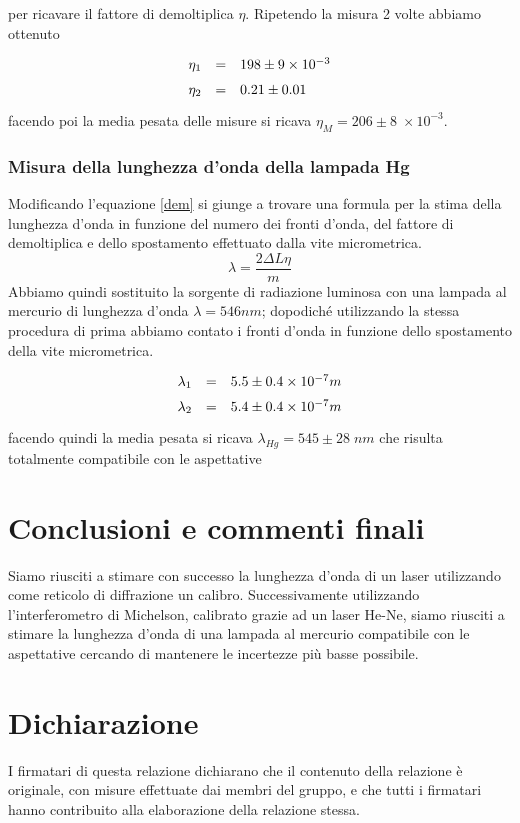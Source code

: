 \documentclass[10pt, a4paper, italian]{article}
\begin{document}
per ricavare il fattore di demoltiplica $\eta$.
Ripetendo la misura 2 volte abbiamo ottenuto 
  \[
\def\arraystretch{1.5}
\begin{array}{rcl}
\eta_1 & = & 198 \pm 9 \times 10^{-3}\\
\eta_2 & = & 0.21 \pm 0.01\\
\end{array}
\]
facendo poi la media pesata delle misure si ricava $\eta_M =206 \pm 8 \; \times 10^{-3}$.

\subsubsection{Misura della lunghezza d'onda della lampada Hg}
Modificando l'equazione \ref{dem} si giunge a trovare una formula per la stima della lunghezza d'onda in funzione del numero dei fronti d'onda, del fattore di demoltiplica e dello spostamento effettuato dalla vite micrometrica.
\[
\lambda=\frac{2\Delta L \eta}{m}
\]
Abbiamo quindi sostituito la sorgente di radiazione luminosa con una lampada al mercurio di lunghezza d'onda $\lambda=546 nm$; dopodiché utilizzando la stessa procedura di prima abbiamo contato i fronti d'onda in funzione dello spostamento della vite micrometrica.
  \[
\def\arraystretch{1.5}
\begin{array}{rcl}
\lambda_1 & = & 5.5 \pm 0.4 \times 10^{-7} m\\
\lambda_2 & = & 5.4 \pm 0.4 \times 10^{-7} m\\
\end{array}
\]
facendo quindi la media pesata si ricava $\lambda _{Hg}=545\pm 28 \; nm$ che risulta totalmente compatibile con le aspettative
\section*{Conclusioni e commenti finali}
Siamo riusciti a stimare con successo la lunghezza d'onda di un laser utilizzando come reticolo di diffrazione un calibro. Successivamente utilizzando l'interferometro di Michelson, calibrato grazie ad un laser He-Ne, siamo riusciti a stimare la lunghezza d'onda di una lampada al mercurio compatibile con le aspettative cercando di mantenere le incertezze più basse possibile.

\section*{Dichiarazione}
I firmatari di questa relazione dichiarano che il contenuto della relazione \`e
originale, con misure effettuate dai membri del gruppo, e che tutti i firmatari
hanno contribuito alla elaborazione della relazione stessa.
\end{document}
